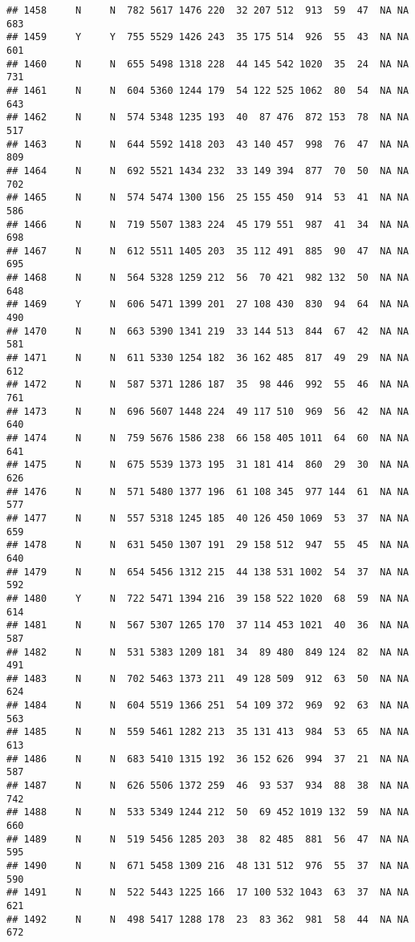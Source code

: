 \documentclass[]{article}
\begin{document}
\begin{verbatim}
## 1458     N     N  782 5617 1476 220  32 207 512  913  59  47  NA NA  683
## 1459     Y     Y  755 5529 1426 243  35 175 514  926  55  43  NA NA  601
## 1460     N     N  655 5498 1318 228  44 145 542 1020  35  24  NA NA  731
## 1461     N     N  604 5360 1244 179  54 122 525 1062  80  54  NA NA  643
## 1462     N     N  574 5348 1235 193  40  87 476  872 153  78  NA NA  517
## 1463     N     N  644 5592 1418 203  43 140 457  998  76  47  NA NA  809
## 1464     N     N  692 5521 1434 232  33 149 394  877  70  50  NA NA  702
## 1465     N     N  574 5474 1300 156  25 155 450  914  53  41  NA NA  586
## 1466     N     N  719 5507 1383 224  45 179 551  987  41  34  NA NA  698
## 1467     N     N  612 5511 1405 203  35 112 491  885  90  47  NA NA  695
## 1468     N     N  564 5328 1259 212  56  70 421  982 132  50  NA NA  648
## 1469     Y     N  606 5471 1399 201  27 108 430  830  94  64  NA NA  490
## 1470     N     N  663 5390 1341 219  33 144 513  844  67  42  NA NA  581
## 1471     N     N  611 5330 1254 182  36 162 485  817  49  29  NA NA  612
## 1472     N     N  587 5371 1286 187  35  98 446  992  55  46  NA NA  761
## 1473     N     N  696 5607 1448 224  49 117 510  969  56  42  NA NA  640
## 1474     N     N  759 5676 1586 238  66 158 405 1011  64  60  NA NA  641
## 1475     N     N  675 5539 1373 195  31 181 414  860  29  30  NA NA  626
## 1476     N     N  571 5480 1377 196  61 108 345  977 144  61  NA NA  577
## 1477     N     N  557 5318 1245 185  40 126 450 1069  53  37  NA NA  659
## 1478     N     N  631 5450 1307 191  29 158 512  947  55  45  NA NA  640
## 1479     N     N  654 5456 1312 215  44 138 531 1002  54  37  NA NA  592
## 1480     Y     N  722 5471 1394 216  39 158 522 1020  68  59  NA NA  614
## 1481     N     N  567 5307 1265 170  37 114 453 1021  40  36  NA NA  587
## 1482     N     N  531 5383 1209 181  34  89 480  849 124  82  NA NA  491
## 1483     N     N  702 5463 1373 211  49 128 509  912  63  50  NA NA  624
## 1484     N     N  604 5519 1366 251  54 109 372  969  92  63  NA NA  563
## 1485     N     N  559 5461 1282 213  35 131 413  984  53  65  NA NA  613
## 1486     N     N  683 5410 1315 192  36 152 626  994  37  21  NA NA  587
## 1487     N     N  626 5506 1372 259  46  93 537  934  88  38  NA NA  742
## 1488     N     N  533 5349 1244 212  50  69 452 1019 132  59  NA NA  660
## 1489     N     N  519 5456 1285 203  38  82 485  881  56  47  NA NA  595
## 1490     N     N  671 5458 1309 216  48 131 512  976  55  37  NA NA  590
## 1491     N     N  522 5443 1225 166  17 100 532 1043  63  37  NA NA  621
## 1492     N     N  498 5417 1288 178  23  83 362  981  58  44  NA NA  672

\end{verbatim}
\end{document}
